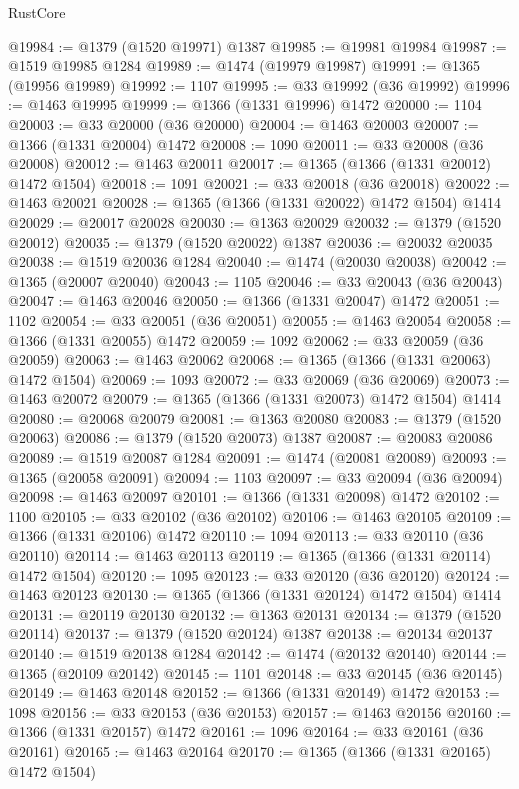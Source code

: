 \begin{lexlean}{RustCore}
\begin{coremodule}
@19984 := @1379 (@1520 @19971) @1387
@19985 := @19981 @19984
@19987 := @1519 @19985 @1284
@19989 := @1474 (@19979 @19987)
@19991 := @1365 (@19956 @19989)
@19992 := 1107
@19995 := @33 @19992 (@36 @19992)
@19996 := @1463 @19995
@19999 := @1366 (@1331 @19996) @1472
@20000 := 1104
@20003 := @33 @20000 (@36 @20000)
@20004 := @1463 @20003
@20007 := @1366 (@1331 @20004) @1472
@20008 := 1090
@20011 := @33 @20008 (@36 @20008)
@20012 := @1463 @20011
@20017 := @1365 (@1366 (@1331 @20012) @1472 @1504)
@20018 := 1091
@20021 := @33 @20018 (@36 @20018)
@20022 := @1463 @20021
@20028 := @1365 (@1366 (@1331 @20022) @1472 @1504) @1414
@20029 := @20017 @20028
@20030 := @1363 @20029
@20032 := @1379 (@1520 @20012)
@20035 := @1379 (@1520 @20022) @1387
@20036 := @20032 @20035
@20038 := @1519 @20036 @1284
@20040 := @1474 (@20030 @20038)
@20042 := @1365 (@20007 @20040)
@20043 := 1105
@20046 := @33 @20043 (@36 @20043)
@20047 := @1463 @20046
@20050 := @1366 (@1331 @20047) @1472
@20051 := 1102
@20054 := @33 @20051 (@36 @20051)
@20055 := @1463 @20054
@20058 := @1366 (@1331 @20055) @1472
@20059 := 1092
@20062 := @33 @20059 (@36 @20059)
@20063 := @1463 @20062
@20068 := @1365 (@1366 (@1331 @20063) @1472 @1504)
@20069 := 1093
@20072 := @33 @20069 (@36 @20069)
@20073 := @1463 @20072
@20079 := @1365 (@1366 (@1331 @20073) @1472 @1504) @1414
@20080 := @20068 @20079
@20081 := @1363 @20080
@20083 := @1379 (@1520 @20063)
@20086 := @1379 (@1520 @20073) @1387
@20087 := @20083 @20086
@20089 := @1519 @20087 @1284
@20091 := @1474 (@20081 @20089)
@20093 := @1365 (@20058 @20091)
@20094 := 1103
@20097 := @33 @20094 (@36 @20094)
@20098 := @1463 @20097
@20101 := @1366 (@1331 @20098) @1472
@20102 := 1100
@20105 := @33 @20102 (@36 @20102)
@20106 := @1463 @20105
@20109 := @1366 (@1331 @20106) @1472
@20110 := 1094
@20113 := @33 @20110 (@36 @20110)
@20114 := @1463 @20113
@20119 := @1365 (@1366 (@1331 @20114) @1472 @1504)
@20120 := 1095
@20123 := @33 @20120 (@36 @20120)
@20124 := @1463 @20123
@20130 := @1365 (@1366 (@1331 @20124) @1472 @1504) @1414
@20131 := @20119 @20130
@20132 := @1363 @20131
@20134 := @1379 (@1520 @20114)
@20137 := @1379 (@1520 @20124) @1387
@20138 := @20134 @20137
@20140 := @1519 @20138 @1284
@20142 := @1474 (@20132 @20140)
@20144 := @1365 (@20109 @20142)
@20145 := 1101
@20148 := @33 @20145 (@36 @20145)
@20149 := @1463 @20148
@20152 := @1366 (@1331 @20149) @1472
@20153 := 1098
@20156 := @33 @20153 (@36 @20153)
@20157 := @1463 @20156
@20160 := @1366 (@1331 @20157) @1472
@20161 := 1096
@20164 := @33 @20161 (@36 @20161)
@20165 := @1463 @20164
@20170 := @1365 (@1366 (@1331 @20165) @1472 @1504)

\end{coremodule}
\end{lexlean}
